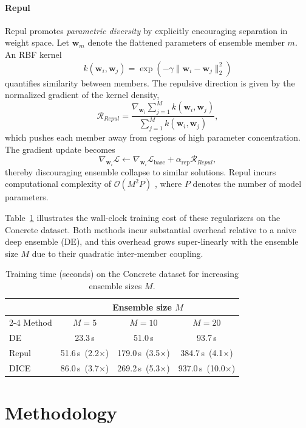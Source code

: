 \documentclass[sigconf]{acmart}
\begin{document}
\paragraph{Repul}
Repul promotes \emph{parametric diversity} by explicitly encouraging separation in weight space.
Let $\mathbf{w}_m$ denote the flattened parameters of ensemble member $m$.
An RBF kernel
\[
k(\mathbf{w}_i,\mathbf{w}_j)
=
\exp\!\left(-\gamma\|\mathbf{w}_i-\mathbf{w}_j\|_2^2\right)
\]
quantifies similarity between members. The repulsive direction is given by the normalized gradient of the kernel density,
\[
\mathcal{R}_{Repul}
=
\frac{
\nabla_{\mathbf{w}_i}\sum_{j=1}^M k(\mathbf{w}_i,\mathbf{w}_j)
}{
\sum_{j=1}^M k(\mathbf{w}_i,\mathbf{w}_j)
},
\]
which pushes each member away from regions of high parameter concentration.
The gradient update becomes
\[
\nabla_{\mathbf{w}_i}\mathcal{L}
\leftarrow
\nabla_{\mathbf{w}_i}\mathcal{L}_{\text{base}}
+
\alpha_{\text{rep}}\mathcal{R}_{Repul},
\]
thereby discouraging ensemble collapse to similar solutions. Repul incurs computational complexity of
$
\mathcal{O}(M^2 P)
$
, where $P$ denotes the number of model parameters.

Table~\ref{tab:reg_overhead} illustrates the wall-clock training cost of these regularizers on the Concrete dataset.
Both methods incur substantial overhead relative to a naive deep ensemble (DE), and this overhead grows super-linearly with the ensemble size $M$ due to their quadratic inter-member coupling.

\begin{table}[ht]
  \centering
  \caption{Training time (seconds) on the Concrete dataset for increasing ensemble sizes $M$.}
  \label{tab:reg_overhead}
  \begin{tabular}{lccc}
    \toprule
    & \multicolumn{3}{c}{Ensemble size $M$} \\
    \cmidrule(lr){2-4}
    Method & $M=5$ & $M=10$ & $M=20$ \\
    \midrule
    DE    &  23.3\,s          &  51.0\,s          &   93.7\,s \\
    Repul &  51.6\,s\ (2.2$\times$) & 179.0\,s\ (3.5$\times$) & 384.7\,s\ (4.1$\times$) \\
    DICE  &  86.0\,s\ (3.7$\times$) & 269.2\,s\ (5.3$\times$) & 937.0\,s\ (10.0$\times$) \\
    \bottomrule
  \end{tabular}
\end{table}

\section{Methodology}
\label{sec:method}
\end{document}
